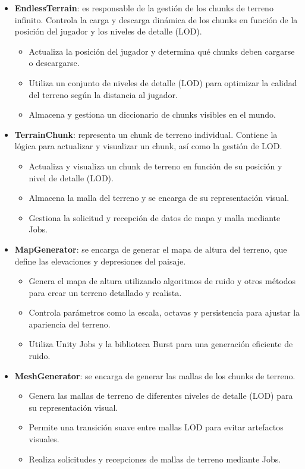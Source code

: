 \begin{itemize}
    \item \textbf{EndlessTerrain}: es responsable de la gestión de los chunks de terreno infinito. Controla la carga y descarga dinámica de los chunks en función de la posición del jugador y los niveles de detalle (LOD).
    \begin{itemize}
        \item Actualiza la posición del jugador y determina qué chunks deben cargarse o descargarse.
        \item Utiliza un conjunto de niveles de detalle (LOD) para optimizar la calidad del terreno según la distancia al jugador.
        \item Almacena y gestiona un diccionario de chunks visibles en el mundo.
    \end{itemize}

    \item \textbf{TerrainChunk}: representa un chunk de terreno individual. Contiene la lógica para actualizar y visualizar un chunk, así como la gestión de LOD.
    \begin{itemize}
        \item Actualiza y visualiza un chunk de terreno en función de su posición y nivel de detalle (LOD).
        \item Almacena la malla del terreno y se encarga de su representación visual.
        \item Gestiona la solicitud y recepción de datos de mapa y malla mediante Jobs.
    \end{itemize}

    \item \textbf{MapGenerator}: se encarga de generar el mapa de altura del terreno, que define las elevaciones y depresiones del paisaje.
    \begin{itemize}
        \item Genera el mapa de altura utilizando algoritmos de ruido y otros métodos para crear un terreno detallado y realista.
        \item Controla parámetros como la escala, octavas y persistencia para ajustar la apariencia del terreno.
        \item Utiliza Unity Jobs y la biblioteca Burst para una generación eficiente de ruido.
    \end{itemize}

    \item \textbf{MeshGenerator}: se encarga de generar las mallas de los chunks de terreno.
    \begin{itemize}
        \item Genera las mallas de terreno de diferentes niveles de detalle (LOD) para su representación visual.
        \item Permite una transición suave entre mallas LOD para evitar artefactos visuales.
        \item Realiza solicitudes y recepciones de mallas de terreno mediante Jobs.
    \end{itemize}


\end{itemize}
